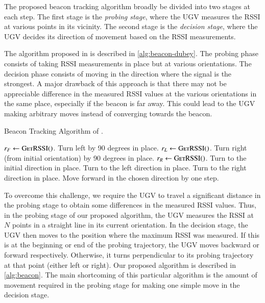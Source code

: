 \documentclass[conference]{IEEEtran}
\begin{document}
The proposed beacon tracking algorithm broadly be divided into two stages at
each step. The first stage is the \emph{probing stage}, where the UGV measures
the RSSI at various points in its vicinity. The second stage is the
\emph{decision stage}, where the UGV decides its direction of movement based on
the RSSI measurements.

The algorithm proposed in
\cite{dubeyNavigationCommunicationUGV2022} is described in
\autoref{alg:beacon-dubey}. The probing phase consists of taking RSSI
measurements in place but at various orientations. The decision phase consists
of moving in the direction where the signal is the strongest. A major drawback
of this approach is that there may not be appreciable difference in the measured
RSSI values at the various orientations in the same place, especially if the
beacon is far away. This could lead to the UGV making arbitrary moves instead of
converging towards the beacon.

\begin{algorithm}[H]
    \caption{Beacon Tracking Algorithm of \cite{dubeyNavigationCommunicationUGV2022}.}
    \label{alg:beacon-dubey}
    \begin{algorithmic}[1]
            \State \(r_F \gets \textsc{GetRSSI()}\).
            \State Turn left by 90 degrees in place.
            \State \(r_L \gets \textsc{GetRSSI()}\).
            \State Turn right (from initial orientation) by 90 degrees in place.
            \State \(r_R \gets \textsc{GetRSSI()}\).
                \State Turn to the initial direction in place.
                \State Turn to the left direction in place.
                \State Turn to the right direction in place.
            \EndIf
            \State Move forward in the chosen direction by one step.
        \EndWhile
    \end{algorithmic}
\end{algorithm}

To overcome this challenge, we require the UGV to travel a significant distance
in the probing stage to obtain some differences in the measured RSSI values.
Thus, in the probing stage of our proposed algorithm, the UGV measures the RSSI
at \(N\) points in a straight line in its current orientation. In the decision
stage, the UGV then moves to the position where the maximum RSSI was measured.
If this is at the beginning or end of the probing trajectory, the UGV moves
backward or forward respectively. Otherwise, it turns perpendicular to its
probing trajectory at that point (either left or right). Our proposed algorithm
is described in \autoref{alg:beacon}. The main shortcoming of this particular
algorithm is the amount of movement required in the probing stage for making one
simple move in the decision stage.
\end{document}
